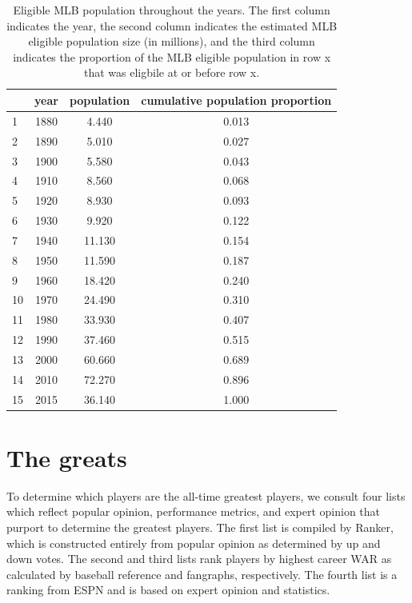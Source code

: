 \documentclass[11pt]{article}\usepackage[]{graphicx}\usepackage[]{color}
\begin{document}
\begin{table}[ht]
\centering
\begin{tabular}{lccc}
  \hline
 & year & population & cumulative population proportion \\ 
  \hline
1 & 1880 & 4.440 & 0.013 \\ 
  2 & 1890 & 5.010 & 0.027 \\ 
  3 & 1900 & 5.580 & 0.043 \\ 
  4 & 1910 & 8.560 & 0.068 \\ 
  5 & 1920 & 8.930 & 0.093 \\ 
  6 & 1930 & 9.920 & 0.122 \\ 
  7 & 1940 & 11.130 & 0.154 \\ 
  8 & 1950 & 11.590 & 0.187 \\ 
  9 & 1960 & 18.420 & 0.240 \\ 
  10 & 1970 & 24.490 & 0.310 \\ 
  11 & 1980 & 33.930 & 0.407 \\ 
  12 & 1990 & 37.460 & 0.515 \\ 
  13 & 2000 & 60.660 & 0.689 \\ 
  14 & 2010 & 72.270 & 0.896 \\ 
  15 & 2015 & 36.140 & 1.000 \\ 
   \hline
\end{tabular}
\caption{Eligible MLB population throughout the years. The first column 
    indicates the year, the second column indicates the estimated MLB eligible 
    population size (in millions), and the third column indicates the proportion 
    of the MLB eligible population in row x that was eligbile at or before row x.} 
\end{table}






\section{The greats}

To determine which players are the all-time greatest players, we consult four 
lists which reflect popular opinion, performance metrics, and expert opinion 
that purport to determine the greatest players.  The first 
list is compiled by Ranker, %
which is constructed entirely from popular opinion as determined by up and 
down votes.  
The second and third lists rank players by highest career WAR as calculated 
by baseball reference and fangraphs, respectively. 
The fourth list is a ranking from ESPN %
and is based on expert opinion and statistics. %
\end{document}
